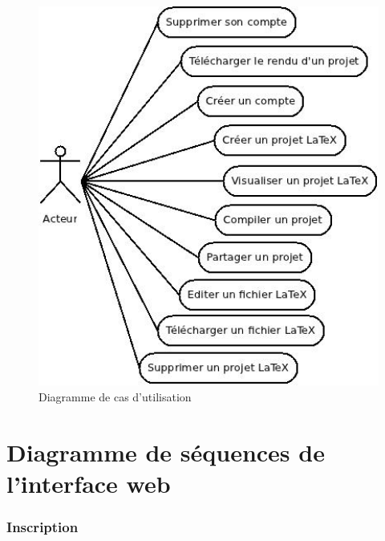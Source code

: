 \documentclass[a4paper,12pt]{article}
\begin{document}
\paragraph{}
\begin{figure}[!ht]
\begin{center}
  \includegraphics[width=1\textwidth]{./Diagramme/diaUseCase.jpg}
\end{center}
  \caption{Diagramme de cas d'utilisation}
  \label{useCases}
\end{figure}

\newpage
\section{Diagramme de séquences de l'interface web}
\subsubsection{Inscription}
\end{document}
